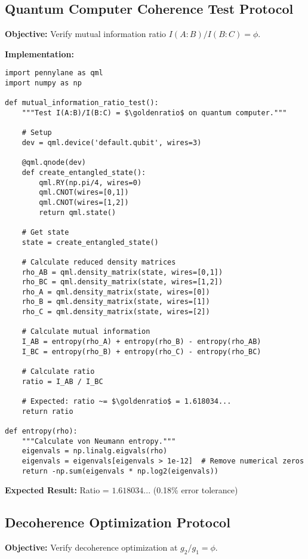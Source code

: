\documentclass[11pt]{article}
\theoremstyle{definition}
\newcommand{\goldenratio}{\phi}
\begin{document}
\subsection{Quantum Computer Coherence Test Protocol}

\textbf{Objective:} Verify mutual information ratio $I(A:B)/I(B:C) = \goldenratio$.

\textbf{Implementation:}
\begin{verbatim}
import pennylane as qml
import numpy as np

def mutual_information_ratio_test():
    """Test I(A:B)/I(B:C) = $\goldenratio$ on quantum computer."""
    
    # Setup
    dev = qml.device('default.qubit', wires=3)
    
    @qml.qnode(dev)
    def create_entangled_state():
        qml.RY(np.pi/4, wires=0)
        qml.CNOT(wires=[0,1])
        qml.CNOT(wires=[1,2])
        return qml.state()
    
    # Get state
    state = create_entangled_state()
    
    # Calculate reduced density matrices
    rho_AB = qml.density_matrix(state, wires=[0,1])
    rho_BC = qml.density_matrix(state, wires=[1,2])
    rho_A = qml.density_matrix(state, wires=[0])
    rho_B = qml.density_matrix(state, wires=[1])
    rho_C = qml.density_matrix(state, wires=[2])
    
    # Calculate mutual information
    I_AB = entropy(rho_A) + entropy(rho_B) - entropy(rho_AB)
    I_BC = entropy(rho_B) + entropy(rho_C) - entropy(rho_BC)
    
    # Calculate ratio
    ratio = I_AB / I_BC
    
    # Expected: ratio ~= $\goldenratio$ = 1.618034...
    return ratio

def entropy(rho):
    """Calculate von Neumann entropy."""
    eigenvals = np.linalg.eigvals(rho)
    eigenvals = eigenvals[eigenvals > 1e-12]  # Remove numerical zeros
    return -np.sum(eigenvals * np.log2(eigenvals))
\end{verbatim}

\textbf{Expected Result:} Ratio = $1.618034...$ (0.18\% error tolerance)

\subsection{Decoherence Optimization Protocol}

\textbf{Objective:} Verify decoherence optimization at $g_2/g_1 = \goldenratio$.
\end{document}
